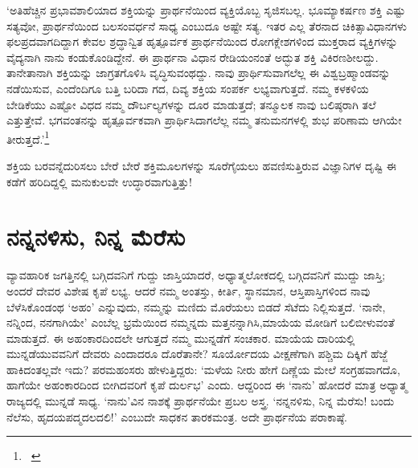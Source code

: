 ‘ಅತಿಹೆಚ್ಚಿನ ಪ್ರಭಾವಶಾಲಿಯಾದ ಶಕ್ತಿಯನ್ನು ಪ್ರಾರ್ಥನೆಯಿಂದ ವ್ಯಕ್ತಿಯೊಬ್ಬ ಸೃಜಿಸಬಲ್ಲ. ಭೂಮ್ಯಾಕರ್ಷಣ ಶಕ್ತಿ ಎಷ್ಟು ಸತ್ಯವೋ, ಪ್ರಾರ್ಥನೆಯಿಂದ ಬಲಸಂವರ್ಧನೆ ಸಾಧ್ಯ ಎಂಬುದೂ ಅಷ್ಟೇ ಸತ್ಯ. ಇತರ ಎಲ್ಲ ತೆರನಾದ ಚಿಕಿತ್ಸಾವಿಧಾನಗಳು ಫಲಪ್ರದವಾಗದಿದ್ದಾಗ ಕೇವಲ ಶ್ರದ್ಧಾನ್ವಿತ ಹೃತ್ಪೂರ್ವಕ ಪ್ರಾರ್ಥನೆಯಿಂದ ರೋಗಕ್ಲೇಶಗಳಿಂದ ಮುಕ್ತರಾದ ವ್ಯಕ್ತಿಗಳನ್ನು ವೈದ್ಯನಾಗಿ ನಾನು ಕಂಡುಕೊಂಡಿದ್ದೇನೆ. ಈ ಪ್ರಾರ್ಥನಾ ವಿಧಾನ ರೇಡಿಯಂನಂತೆ ಅದ್ಭುತ ಶಕ್ತಿ ವಿಕಿರಣಶೀಲದ್ದು. ತಾನೇತಾನಾಗಿ ಶಕ್ತಿಯನ್ನು ಜಾಗ್ರತಗೊಳಿಸಿ ವೃದ್ಧಿಸುವಂಥದ್ದು. ನಾವು ಪ್ರಾರ್ಥಿಸುವಾಗಲೆಲ್ಲ ಈ ವಿಶ್ವಬ್ರಹ್ಮಾಂಡವನ್ನು ನಡೆಯಿಸುವ, ಎಂದೆಂದಿಗೂ ಬತ್ತಿ ಬರಿದಾ ಗದ, ದಿವ್ಯ ಶಕ್ತಿಯ ಸಂಪರ್ಕ ಲಭ್ಯವಾಗುತ್ತದೆ. ನಮ್ಮ ಕಳಕಳಿಯ ಬೇಡಿಕೆಯು ಎಷ್ಟೋ ವಿಧದ ನಮ್ಮ ದೌರ್ಬಲ್ಯಗಳನ್ನು ದೂರ ಮಾಡುತ್ತದೆ; ತನ್ಮೂಲಕ ನಾವು ಬಲಿಷ್ಠರಾಗಿ ತಲೆ ಎತ್ತುತ್ತೇವೆ. ಭಗವಂತನನ್ನು ಹೃತ್ಪೂರ್ವಕವಾಗಿ ಪ್ರಾರ್ಥಿಸಿದಾಗಲೆಲ್ಲ ನಮ್ಮ ತನುಮನಗಳಲ್ಲಿ ಶುಭ ಪರಿಣಾಮ ಆಗಿಯೇ ತೀರುತ್ತದೆ.’\footnote{

~\hfill{}}

ಶಕ್ತಿಯ ಬರವನ್ನೆದುರಿಸಲು ಬೇರೆ ಬೇರೆ ಶಕ್ತಿಮೂಲಗಳನ್ನು ಸೂರೆಗೈಯಲು ಹವಣಿಸುತ್ತಿರುವ ವಿಜ್ಞಾನಿಗಳ ದೃಷ್ಟಿ ಈ ಕಡೆಗೆ ಹರಿದಿದ್ದಲ್ಲಿ ಮನುಕುಲವೇ ಉದ್ಧಾರವಾಗುತ್ತಿತ್ತು!


\section*{ನನ್ನನಳಿಸು, ನಿನ್ನ ಮೆರೆಸು}


ವ್ಯಾವಹಾರಿಕ ಜಗತ್ತಿನಲ್ಲಿ ಬಗ್ಗಿದವನಿಗೆ ಗುದ್ದು ಜಾಸ್ತಿಯಾದರೆ, ಅಧ್ಯಾತ್ಮಲೋಕದಲ್ಲಿ ಬಗ್ಗಿದವನಿಗೆ ಮುದ್ದು ಜಾಸ್ತಿ; ಅಂದರೆ ದೇವರ ವಿಶೇಷ ಕೃಪೆ ಲಭ್ಯ. ಆದರೆ ನಮ್ಮ ಅಂತಸ್ತು, ಕೀರ್ತಿ, ಸ್ಥಾನಮಾನ, ಆಸ್ತಿಪಾಸ್ತಿಗಳಿಂದ ನಾವು ಬೆಳೆಸಿಕೊಂಡಂಥ ‘ಅಹಂ’ ಎನ್ನುವುದು, ನಮ್ಮನ್ನು ಮಣಿದು ಮೊರೆಯಲು ಬಿಡದೆ ಸೆಟೆದು ನಿಲ್ಲಿಸುತ್ತದೆ. ‘ನಾನೇ, ನನ್ನಿಂದ, ನನಗಾಗಿಯೇ’ ಎಂಬೆಲ್ಲ ಭ್ರಮೆಯಿಂದ ನಮ್ಮನ್ನದು ಮತ್ತನನ್ನಾಗಿಸಿ,ಮಾಯೆಯ ಮೋಡಿಗೆ ಬಲಿಬೀಳುವಂತೆ ಮಾಡುತ್ತದೆ. ಈ ಅಹಂಕಾರದಿಂದಲೇ ಆಗುತ್ತದೆ ನಮ್ಮ ಮುನ್ನಡೆಗೆ ಸಂಚಕಾರ. ಮಾಯೆಯ ದಾರಿಯಲ್ಲಿ ಮುನ್ನಡೆಯುವವನಿಗೆ ದೇವರು ಎಂದಾದರೂ ದೊರೆತಾನೇ? ಸೂರ್ಯೋದಯ ವೀಕ್ಷಣೆಗಾಗಿ ಪಶ್ಚಿಮ ದಿಕ್ಕಿಗೆ ಹೆಜ್ಜೆ ಹಾಕಿದಂತಲ್ಲವೇ ಇದು? ಪರಮಹಂಸರು ಹೇಳುತ್ತಿದ್ದರು: ‘ಮಳೆಯ ನೀರು ಹೇಗೆ ದಿಣ್ಣೆಯ ಮೇಲೆ ಸಂಗ್ರಹವಾಗದೊ, ಹಾಗೆಯೇ ಅಹಂಕಾರದಿಂದ ಬೀಗಿದವರಿಗೆ ಕೃಪೆ ದುರ್ಲಭ’ ಎಂದು. ಆದ್ದರಿಂದ ಈ ‘ನಾನು’ ಹೋದರೆ ಮಾತ್ರ ಅಧ್ಯಾತ್ಮ ರಾಜ್ಯದಲ್ಲಿ ಮುನ್ನಡೆ ಸಾಧ್ಯ. ‘ನಾನು’ವಿನ ನಾಶಕ್ಕೆ ಪ್ರಾರ್ಥನೆಯೇ ಪ್ರಬಲ ಅಸ್ತ್ರ. ‘ನನ್ನನಳಿಸು, ನಿನ್ನ ಮೆರೆಸು! ಬಂದು ನೆಲೆಸು, ಹೃದಯಪದ್ಮದಲದಲಿ!’ ಎಂಬುದೇ ಸಾಧಕನ ತಾರಕಮಂತ್ರ. ಅದೇ ಪ್ರಾರ್ಥನೆಯ ಪರಾಕಾಷ್ಠೆ.

